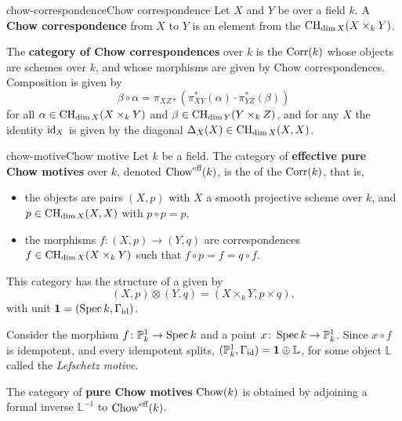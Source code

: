 \begin{topic}{chow-correspondence}{Chow correspondence}
    Let $X$ and $Y$ be  over a field $k$. A \textbf{Chow correspondence} from $X$ to $Y$ is an element from the  $\textup{CH}_{\dim X}(X \times_k Y)$.
    
    The \textbf{category of Chow correspondences} over $k$ is the  $\textup{Corr}(k)$ whose objects are   schemes over $k$, and whose morphisms are given by Chow correspondences. Composition is given by
    \[ \beta \circ \alpha = \pi_{XZ*}(\pi_{XY}^*(\alpha) \cdot \pi_{YZ}^*(\beta)) \]
    for all $\alpha \in \textup{CH}_{\dim X}(X \times_k Y)$ and $\beta \in \textup{CH}_{\dim Y}(Y \times_k Z)$, and for any $X$ the identity $\textup{id}_X$ is given by the diagonal $\Delta_X(X) \in \textup{CH}_{\dim X}(X, X)$.
\end{topic}

\begin{topic}{chow-motive}{Chow motive}
    Let $k$ be a field. The category of \textbf{effective pure Chow motives} over $k$, denoted $\textup{Chow}^\textup{eff}(k)$, is the  of the  $\textup{Corr}(k)$, that is,
    \begin{itemize}
        \item the objects are pairs $(X, p)$ with $X$ a smooth projective scheme over $k$, and $p \in \textup{CH}_{\dim X}(X, X)$ with $p \circ p = p$,
        \item the morphisms $f \colon (X, p) \to (Y, q)$ are correspondences $f \in \textup{CH}_{\dim X}(X \times_k Y)$ such that $f \circ p = f = q \circ f$.
    \end{itemize}
    This category has the structure of a  given by
    \[ (X, p) \otimes (Y, q) = (X \times_k Y, p \times q) , \]
    with unit $\textbf{1} = (\operatorname{Spec} k, \Gamma_{\textup{id}})$.
    
    Consider the morphism $f \colon \mathbb{P}^1_k \to \operatorname{Spec} k$ and a point $x \colon \operatorname{Spec} k \to \mathbb{P}^1_k$. Since $x \circ f$ is idempotent, and every idempotent splits, $(\mathbb{P}^1_k, \Gamma_{\textup{id}}) = \textbf{1} \oplus \mathbb{L}$, for some object $\mathbb{L}$ called the \textit{Lefschetz motive}.
    
    The category of \textbf{pure Chow motives} $\textup{Chow}(k)$ is obtained by adjoining a formal inverse $\mathbb{L}^{-1}$ to $\textup{Chow}^\textup{eff}(k)$.
\end{topic}

